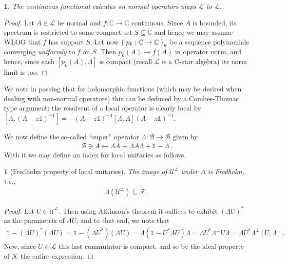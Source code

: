\documentclass[a4paper,10pt]{article}
\numberwithin{equation}{section}
\theoremstyle{plain}
\theoremstyle{plain}
\newtheorem{lem}[thm]{\protect\lemmaname}
\theoremstyle{plain}
\theoremstyle{plain}
\theoremstyle{plain}
\theoremstyle{remark}
\theoremstyle{definition}
\theoremstyle{plain}
\providecommand{\lemmaname}{Lemma}
\newcommand{\CC}{\mathbb{C}}
\newcommand{\calB}{\mathcal{B}}
\newcommand{\calF}{\mathcal{F}}
\newcommand{\calU}{\mathcal{U}}
\newcommand{\calK}{\mathcal{K}}
\newcommand{\calL}{\mathcal{L}}
\newcommand{\bbLambda}{\mathbb{\Lambda}}
\newcommand{\Id}{\mathds{1}}
\newcommand{\quotes}[1]{``#1''}
\newcommand{\eq}[1]{\begin{align*}#1\end{align*}}
\newcommand{\eql}[1]{\begin{align}#1\end{align}}
\begin{document}
	
	
	\begin{lem}\label{lem:continuous functional calculus of normals is local}The continuous functional calculus on normal operators maps $\calL$ to $\calL$.
	\end{lem}
	\begin{proof}
		Let $A\in\calL$ be normal and $f:\CC\to\CC$ continuous. Since $A$ is bounded, its spectrum is restricted to some compact set $S\subseteq\CC$ and hence we may assume WLOG that $f$ has support $S$. Let now $\Set{p_k:\CC\to\CC}_k$ be a sequence polynomials converging \emph{uniformly} to $f$ on $S$. Then $p_k(A)\to f(A)$ in operator norm, and hence, since each $[p_k(A),\Lambda]$ is compact (recall $\calL$ is a C-star algebra) its norm limit is too. 
	\end{proof}
	We note in passing that for holomorphic functions (which may be desired when dealing with non-normal operators) this can be deduced by a Combes-Thomas type argument: the resolvent of a local operator is clearly local by $[\Lambda,(A-z\Id)^{-1}]=-(A-z\Id)^{-1}[\Lambda,A](A-z\Id)^{-1}$.
	
	
	We now define the so-called \quotes{super} operator $\bbLambda:\calB\to\calB$ given by \eql{\calB\ni A \mapsto \bbLambda A \equiv \Lambda A \Lambda + \Id-\Lambda\,.} With it we may define an index for local unitaries as follows.
	\begin{lem}[Fredholm property of local unitaries] The image of $\calU^\calL$ under $\bbLambda$ is Fredholm, i.e., \eq{\bbLambda(\calU^\calL)\subseteq\calF\,.} 
	\end{lem}
	\begin{proof}
		Let $U\in\calU^\calL$. Then using Atkinson's theorem \cite{Booss_Topology_and_Analysis} it suffices to exhibit $(\bbLambda U)^\ast$ as the parametrix of $\bbLambda U$, and to that end, we note that \eq{ \Id-(\bbLambda U)^\ast(\bbLambda U)=\Id-(\bbLambda U^\ast)(\bbLambda U) = \Lambda(\Id-U^\ast\Lambda U)\Lambda 
			= \Lambda U^\ast \Lambda^\perp U\Lambda 
			= \Lambda U^\ast \Lambda^\perp [U,\Lambda]\,.
		} Now, since $U\in\calL$ this last commutator is compact, and so by the ideal property of $\calK$ the entire expression.
	\end{proof}
	
\end{document}
